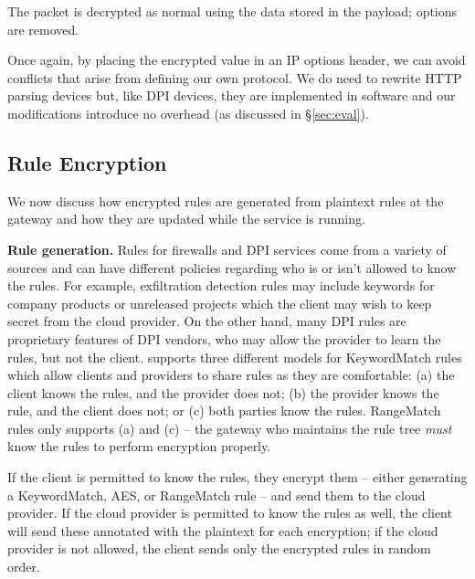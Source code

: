 The packet is decrypted as normal using the data stored in the payload; options are removed.

Once again, by placing the encrypted value in an IP options header, we can avoid conflicts that arise from defining our own protocol.
We do need to rewrite HTTP parsing devices but, like DPI devices, they are implemented in software and our modifications introduce no overhead (as discussed in \S\ref{sec:eval}).


\subsection{Rule Encryption}
\label{sec:rulenc}

We now discuss how encrypted rules are generated from plaintext rules at the gateway and how they are updated while the service is running.

\noindent\textbf{Rule generation.} Rules for firewalls and DPI services come from a variety of sources and can have different policies regarding who is or isn't allowed to know the rules. 
For example, exfiltration detection rules may include keywords for company products or unreleased projects which the client may wish to keep secret from the cloud provider. 
On the other hand, many DPI rules are proprietary features of DPI vendors, who may allow the provider to learn the rules, but not the client.
\sys supports three different models for KeywordMatch rules which allow clients and providers to share rules as they are comfortable: (a) the client knows the rules, and the provider does not; (b) the provider knows the rule, and the client does not; or (c) both parties know the rules.
RangeMatch rules only supports (a) and (c) -- the gateway who maintains the rule tree {\it must} know the rules to perform encryption properly.

If the client is permitted to know the rules, they encrypt them -- either generating a KeywordMatch, AES, or RangeMatch rule -- and send them to the cloud provider. If the cloud provider is permitted to know the rules as well, the client will send these annotated with the plaintext for each encryption; if the cloud provider is not allowed, the client sends only the encrypted rules in random order.

